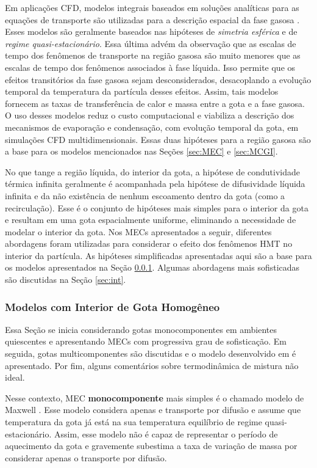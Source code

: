 Em aplicações CFD, modelos integrais baseados em soluções analíticas para as equações de transporte são utilizadas para a descrição espacial da fase gasosa \cite{Sazhin2006}.
Esses modelos são geralmente baseados nas hipóteses de \emph{simetria esférica} e de \emph{regime quasi-estacionário}.
Essa última advém da observação que as escalas de tempo dos fenômenos de transporte na região gasosa são muito menores que as escalas de tempo dos fenômenos associados à fase líquida. Isso permite que os efeitos transitórios da fase gasosa sejam desconsiderados, desacoplando a evolução temporal da temperatura da partícula desses efeitos. 
Assim, tais modelos fornecem as taxas de transferência de calor e massa entre a gota e a fase gasosa.
O uso desses modelos reduz o custo computacional e viabiliza a descrição dos mecanismos de evaporação e condensação, com evolução temporal da gota, em simulações CFD multidimensionais.
Essas duas hipóteses para a região gasosa são a base para os modelos mencionados nas Seções \ref{sec:MEC} e \ref{sec:MCGI}.

No que tange a região líquida, do interior da gota, a hipótese de condutividade térmica infinita geralmente é acompanhada pela hipótese de difusividade líquida infinita e da não existência de nenhum escoamento dentro da gota (como a recirculação).
Esse é o conjunto de hipóteses mais simples para o interior da gota e resultam em uma gota espacialmente uniforme, eliminando a necessidade de modelar o interior da gota.
Nos MECs apresentados a seguir, diferentes abordagens foram utilizadas para considerar o efeito dos fenômenos HMT no interior da partícula.
As hipóteses simplificadas apresentadas aqui são a base para os modelos apresentados na Seção \ref{sec:RMM}.
Algumas abordagens mais sofisticadas são discutidas na Seção \ref{sec:int}.


\subsubsection{Modelos com Interior de Gota Homogêneo} \label{sec:RMM}

Essa Seção se inicia considerando gotas monocomponentes em ambientes quiescentes e apresentando MECs com progressiva grau de sofisticação.
Em seguida, gotas multicomponentes são discutidas e o modelo desenvolvido em \cite{SacomanoF2022IJHMT} é apresentado.
Por fim, alguns comentários sobre termodinâmica de mistura não ideal.

Nesse contexto, MEC \textbf{monocomponente} mais simples é o  chamado modelo de Maxwell \cite{Fuchs1959,Sazhin2006}.
Esse modelo considera apenas e transporte por difusão e assume que temperatura da gota já está na sua temperatura equilíbrio de regime quasi-estacionário.
Assim, esse modelo não é capaz de representar o período de aquecimento da gota e gravemente subestima a taxa de variação de massa por considerar apenas o transporte por difusão.

